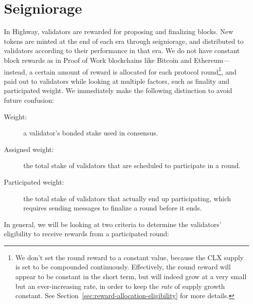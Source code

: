 \section{Seigniorage}




In Highway, validators are rewarded for proposing and finalizing blocks. New tokens are minted at the end of each era through seigniorage, and distributed to validators according to their performance in that era. We do not have constant block rewards as in Proof of Work blockchains like Bitcoin and Ethereum---instead, a certain amount of reward is allocated for each protocol round\footnote{We don't set the round reward to a constant value, because the CLX supply is set to be compounded continuously. Effectively, the round reward will appear to be constant in the short term, but will indeed grow at a very small but an ever-increasing rate, in order to keep the \emph{rate} of supply growth constant. See Section~\ref{sec:reward-allocation-eligibility} for more details.}, and paid out to validators while looking at multiple factors, such as finality and participated weight. We immediately make the following distinction to avoid future confusion:

\begin{description}
\item[Weight:] a validator's bonded stake used in consensus.
\item[Assigned weight:] the total stake of validators that are scheduled to participate in a round.
\item[Participated weight:] the total stake of validators that actually end up participating, which requires sending messages to finalize a round before it ends.
\end{description}

In general, we will be looking at two criteria to determine the validators' eligibility to receive rewards from a participated round:

